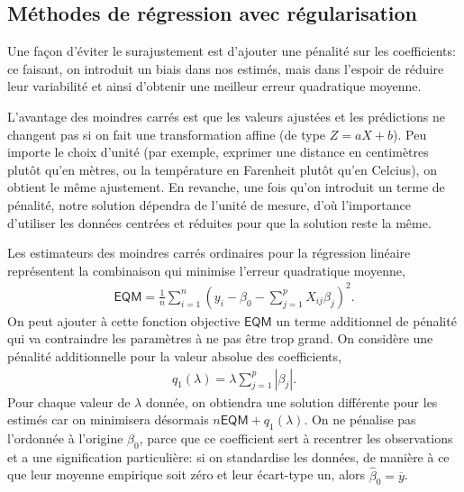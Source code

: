 \documentclass[
  11pt,
  letterpaper,
]{scrbook}
\theoremstyle{definition}
\theoremstyle{remark}
\begin{document}
\subsection{Méthodes de régression avec
régularisation}\label{muxe9thodes-de-ruxe9gression-avec-ruxe9gularisation}

Une façon d'éviter le surajustement est d'ajouter une pénalité sur les
coefficients: ce faisant, on introduit un biais dans nos estimés, mais
dans l'espoir de réduire leur variabilité et ainsi d'obtenir une
meilleur erreur quadratique moyenne.

L'avantage des moindres carrés est que les valeurs ajustées et les
prédictions ne changent pas si on fait une transformation affine (de
type \(Z = aX+b\)). Peu importe le choix d'unité (par exemple, exprimer
une distance en centimètres plutôt qu'en mètres, ou la température en
Farenheit plutôt qu'en Celcius), on obtient le même ajustement. En
revanche, une fois qu'on introduit un terme de pénalité, notre solution
dépendra de l'unité de mesure, d'où l'importance d'utiliser les données
centrées et réduites pour que la solution reste la même.

Les estimateurs des moindres carrés ordinaires pour la régression
linéaire représentent la combinaison qui minimise l'erreur quadratique
moyenne, \begin{align*}
\mathsf{EQM} = \frac{1}{n}\sum_{i=1}^n \left(y_i - \beta_0 - \sum_{j=1}^pX_{ij}\beta_{j}\right)^2.
\end{align*} On peut ajouter à cette fonction objective \(\mathsf{EQM}\)
un terme additionnel de pénalité qui va contraindre les paramètres à ne
pas être trop grand. On considère une pénalité additionnelle pour la
valeur absolue des coefficients, \begin{align*}
q_1(\lambda) = \lambda \sum_{j=1}^p |\beta_j|.
\end{align*} Pour chaque valeur de \(\lambda\) donnée, on obtiendra une
solution différente pour les estimés car on minimisera désormais
\(n\mathsf{EQM} + q_1(\lambda)\). On ne pénalise pas l'ordonnée à
l'origine \(\beta_0\), parce que ce coefficient sert à recentrer les
observations et a une signification particulière: si on standardise les
données, de manière à ce que leur moyenne empirique soit zéro et leur
écart-type un, alors \(\widehat{\beta}_0 = \overline{y}\).
\end{document}
